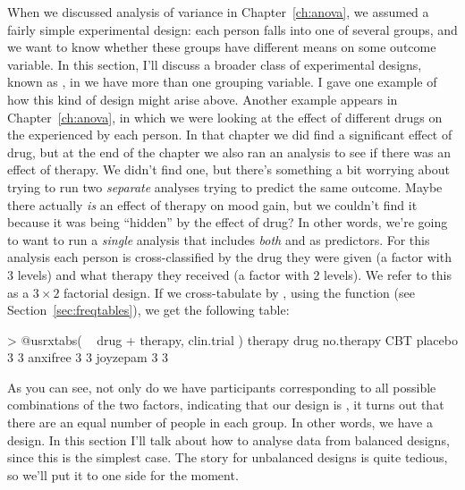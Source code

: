 When we discussed analysis of variance in Chapter~\ref{ch:anova}, we assumed a fairly simple experimental design: each person falls into one of several groups, and we want to know whether these groups have different means on some outcome variable. In this section, I'll discuss a broader class of experimental designs, known as , in we have more than one grouping variable. I gave one example of how this kind of design might arise above. Another example appears in  Chapter~\ref{ch:anova}, in which we were looking at the effect of different drugs on the  experienced by each person. In that chapter we did find a significant effect of drug, but at the end of the chapter we also ran an analysis to see if there was an effect of therapy. We didn't find one, but there's something a bit worrying about trying to run two {\it separate} analyses trying to predict the same outcome. Maybe there actually {\it is} an effect of therapy on mood gain, but we couldn't find it because it was being ``hidden'' by the effect of drug? In other words, we're going to want to run a {\it single} analysis that includes {\it both}  and  as predictors. For this analysis each person is cross-classified by the drug they were given (a factor with 3 levels) and what therapy they received (a factor with 2 levels). We refer to this as a $3 \times 2$ factorial design. If we cross-tabulate  by , using the  function (see Section~\ref{sec:freqtables}), we get the following table:%
\begin{rblock1}
> @usr{xtabs( ~ drug + therapy, clin.trial )}
          therapy
drug       no.therapy CBT
  placebo           3   3
  anxifree          3   3
  joyzepam          3   3
\end{rblock1}
As you can see, not only do we have participants corresponding to all possible combinations of the two factors, indicating that our design is , it turns out that there are an equal number of people in each group. In other words, we have a  design. In this section I'll talk about how to analyse data from balanced designs, since this is the simplest case. The story for unbalanced designs is quite tedious, so we'll put it to one side for the moment.



